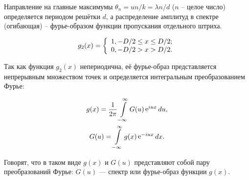 \documentclass[a5paper,10pt, twoside]{article} %
\begin{document}
		Направление на главные максимумы $\theta_n = un / k = \lambda n / d$ ($n$ -- целое число) определяется периодом решётки $d$, а распределение амплитуд в спектре (огибающая) -- фурье-образом функции пропускания отдельного штриха.
		
		\begin{equation}
			g_2(x) = 
			\left\lbrace\begin{array}{c} 
				1, -D / 2 \le x \le D / 2; \\ 
				0, -D / 2 > x > D / 2.
			 \end{array} \right.
		\end{equation}
		
		Так	как функция	$g_2(x)$ непериодична, её фурье-образ представляется непрерывным множеством точек и определяется интегральным преобразованием Фурье:
		
		\begin{equation}
			\begin{gathered} 
				g(x) = \frac{1}{2\pi} \int\limits_{-\infty}^{\infty} G(u) \mathop{\mathrm e}\nolimits^{iux} du,\\
				G(u) = \int\limits_{-\infty}^{\infty} g(x) \mathop{\mathrm e}\nolimits^{-iux} dx.
			 \end{gathered}
		\end{equation}
		
		Говорят, что в таком виде $g(x)$ и $G(u)$ представляют собой пару преобразований Фурье: $G(u)$ — спектр или фурье-образ функции $g(x)$.
		
\end{document}

